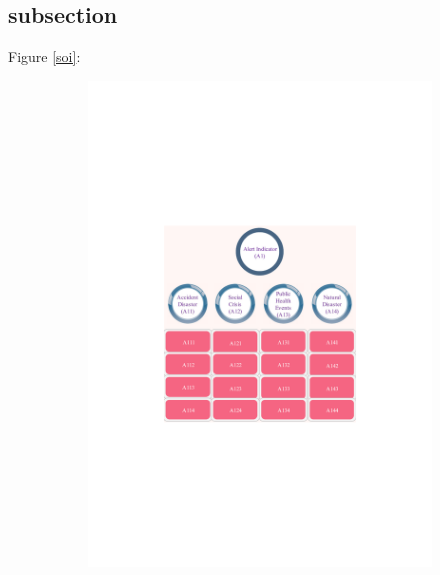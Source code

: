 \documentclass[12pt]{article}  %
\begin{document}
\subsection{subsection}
 Figure \ref{soi}:
\begin{figure}[htbp]
\centering
\begin{subfigure}[b]{.32\textwidth}
\includegraphics[width=\textwidth]{img/1.pdf}
\end{subfigure}
\begin{subfigure}[b]{.32\textwidth}

\end{subfigure}
\end{figure}
\end{document}

